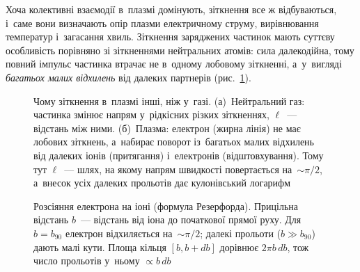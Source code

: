 Хоча колективні взаємодії в~плазмі домінують, зіткнення все ж відбуваються, і~саме вони
визначають опір плазми електричному струму, вирівнювання температур і~загасання хвиль.
Зіткнення заряджених частинок мають суттєву особливість порівняно зі зіткненнями
нейтральних атомів: сила далекодійна, тому повний імпульс частинка втрачає не в~одному
лобовому зіткненні, а~у~вигляді \emph{багатьох малих відхилень} від далеких партнерів
(рис.~\ref{fig:elpath}).

\begin{figure}[ht]\centering
	\begin{subfigure}[b]{0.46\linewidth}\centering
	\end{subfigure}\hfill
	\begin{subfigure}[b]{0.52\linewidth}\centering
	\end{subfigure}
	\caption{Чому зіткнення в~плазмі інші, ніж у~газі. (а)~Нейтральний газ: частинка змінює напрям у~рідкісних різких
	зіткненнях, $\ell$~--- відстань між ними. (б)~Плазма: електрон (жирна лінія) не має лобових зіткнень, а~набирає поворот
	із~багатьох малих відхилень від далеких іонів (притягання) і~електронів (відштовхування). Тому тут $\ell$~--- шлях,
	на якому напрям швидкості повертається на~$\sim\pi/2$, а~внесок усіх далеких прольотів дає кулонівський логарифм}
	\label{fig:elpath}
\end{figure}

\begin{figure}[ht]\centering
	\caption{Розсіяння електрона на іоні (формула Резерфорда). Прицільна відстань $b$~--- відстань від іона до
	початкової прямої руху. Для $b=b_{90}$ електрон відхиляється на~$\sim\pi/2$; далекі прольоти ($b\gg b_{90}$) дають
	малі кути. Площа кільця $[b,b+db]$ дорівнює $2\pi b\,db$, тож число прольотів у~ньому $\propto b\,db$}
	\label{fig:rutherford}
\end{figure}

